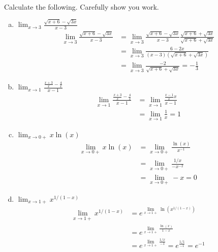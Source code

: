 \documentclass[11pt]{exam}
\theoremstyle{definition}
\begin{document}
\begin{questions}
\newpage
\question[10]\mbox{}
Calculate the following.  Carefully show you work.
\begin{enumerate}[(a)]
\item $\lim_{x\rightarrow 3}\frac{\sqrt{x+6}-\sqrt{3x}}{x-3}$
\begin{align*}
\lim_{x\rightarrow 3}\frac{\sqrt{x+6}-\sqrt{3x}}{x-3}
  & = \lim_{x\rightarrow 3}\frac{\sqrt{x+6}-\sqrt{3x}}{x-3}\frac{\sqrt{x+6}+\sqrt{3x}}{\sqrt{x+6}+\sqrt{3x}}\\
  & = \lim_{x\rightarrow 3}\frac{6-2x}{(x-3)(\sqrt{x+6}+\sqrt{3x})}\\
  & = \lim_{x\rightarrow 3}\frac{-2}{\sqrt{x+6}+\sqrt{3x}} = -\frac{1}{3}
\end{align*}
\item $\lim_{x\rightarrow 1}\frac{\frac{x+3}{x}-\frac{4}{x}}{x-1}$
\begin{align*}
\lim_{x\rightarrow 1}\frac{\frac{x+3}{x}-\frac{4}{x}}{x-1}
  & = \lim_{x\rightarrow 1}\frac{\frac{x-1}{x}{x}}{x-1}\\
  & = \lim_{x\rightarrow 1}\frac{1}{x} = 1
\end{align*}
\item $\lim_{x\rightarrow 0+} x\ln(x)$
\begin{align*}
\lim_{x\rightarrow 0+} x\ln(x)
  & = \lim_{x\rightarrow 0+} \frac{\ln(x)}{x^{-1}}\\
  & = \lim_{x\rightarrow 0+} \frac{1/x}{-x^{-2}}\\
  & = \lim_{x\rightarrow 0+} -x = 0
\end{align*}
\item $\lim_{x\rightarrow 1+} x^{1/(1-x)}$
\begin{align*}
\lim_{x\rightarrow 1+} x^{1/(1-x)}
  & = e^{\lim_{x\rightarrow 1+} \ln(x^{1/(1-x)})}\\
  & = e^{\lim_{x\rightarrow 1+} \frac{\ln(x)}{1-x}}\\
  & = e^{\lim_{x\rightarrow 1+} \frac{1/x}{-1}} = e^{\frac{1/1}{-1}} = e^{-1}
\end{align*}
\end{enumerate}


\end{questions}
\end{document}
